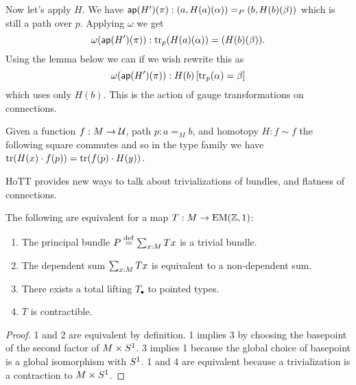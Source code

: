 Now let's apply \( H \). We have \( \mathsf{ap}(H')(\pi):(a,H(a)(\alpha))=_P(b,H(b)(\beta)) \) which is still a path over \( p \). Applying \( \omega \) we get \[ \omega(\mathsf{ap}(H')(\pi)):\mathrm{tr}_p(H(a)(\alpha))=(H(b)(\beta)). \] Using the lemma below we can if we wish rewrite this as 
\[ 
\omega(\mathsf{ap}(H')(\pi)):H(b)\left[\mathrm{tr}_p(\alpha)=\beta\right]
\]
which uses only \( H(b) \). This is the action of gauge transformations on connections.

\begin{mylemma}
Given a function \( f:M\to\mathcal{U} \), path \( p:a=_M b \), and homotopy \( H:f\sim f \) the following square commutes and so in the type family we have \( \mathrm{tr}(H(x)\cdot f(p)) = \mathrm{tr}(f(p)\cdot H(y)) \).
\end{mylemma}
\begin{center}
\end{center}

HoTT provides new ways to talk about trivializations of bundles, and flatness of connections.

\begin{mythm}\label{thm:triv}
The following are equivalent for a map \( T:M\to\mathrm{EM}(\mathbb{Z},1) \):
\begin{enumerate}
\item The principal bundle \( P\stackrel{\mathrm{def}}{=}\sum_{x:M}Tx \) is a trivial bundle.
\item The dependent sum \( \sum_{x:M}Tx \) is equivalent to a non-dependent sum.
\item There exists a total lifting \( T_\bullet \) to pointed types.
\item \( T \) is contractible.
\end{enumerate}
\end{mythm}

\begin{proof}
1 and 2 are equivalent by definition. 1 implies 3 by choosing the basepoint of the second factor of \( M\times S^1 \). 3 implies 1 because the global choice of basepoint is a global isomorphism with \( S^1 \). 1 and 4 are equivalent because a trivialization is a contraction to \( M\times S^1 \).
\end{proof}

